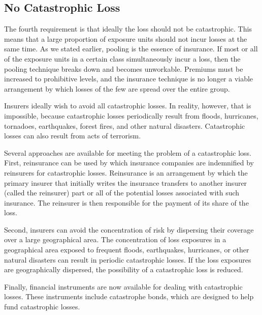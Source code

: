 \subsection{No Catastrophic Loss}
The fourth requirement is that ideally the loss should not be catastrophic. This means that a large proportion of exposure units should not incur losses at the same time. As we stated earlier, pooling is the essence of insurance. If most or all of the exposure units in a certain class simultaneously incur a loss, then the pooling technique breaks down and becomes unworkable. Premiums must be increased to prohibitive levels, and the insurance technique is no longer a viable arrangement by which losses of the few are spread over the entire group.\\
\par
Insurers ideally wish to avoid all catastrophic losses. In reality, however, that is impossible, because catastrophic losses periodically result from floods, hurricanes, tornadoes, earthquakes, forest fires, and other natural disasters. Catastrophic losses can also result from acts of terrorism.\\
\par
Several approaches are available for meeting the problem of a catastrophic loss. First, reinsurance can be used by which insurance companies are indemnified by reinsurers for catastrophic losses. Reinsurance is an arrangement by which the primary insurer that initially writes the insurance transfers to another insurer (called the reinsurer) part or all of the potential losses associated with such insurance. The reinsurer is then responsible for the payment of its share of the loss.\\
\par
Second, insurers can avoid the concentration of
risk by dispersing their coverage over a large geographical area. The concentration of loss exposures in a geographical area exposed to frequent floods, earthquakes, hurricanes, or other natural disasters can result in periodic catastrophic losses. If the loss exposures are geographically dispersed, the possibility of a catastrophic loss is reduced.\\
\par
Finally, financial instruments are now available for dealing with catastrophic losses. These instruments include catastrophe bonds, which are designed to help fund catastrophic losses.
%
